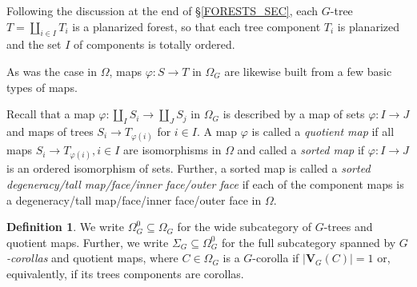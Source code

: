 \documentclass[a4paper,10pt
,draft
]{article}%
\numberwithin{equation}{section}
\numberwithin{figure}{section}
\theoremstyle{definition} %
\newtheorem{definition}[equation]{Definition}%
\newcommand{\1}{\ensuremath{\mathbbm 1}}%
\begin{document}
Following the discussion at the end of \S \ref{FORESTS_SEC},
each $G$-tree
$T = \amalg_{i \in I} T_i$
is a planarized forest,
so that each tree component $T_i$
is planarized and the set $I$ of components
is totally ordered.

As was the case in $\Omega$,
maps $\varphi \colon S \to T$ in $\Omega_G$
are likewise built from a few basic types of maps.

Recall that a map
$\varphi \colon 
\amalg_I S_i
\to
\amalg_J S_j
$
in $\Omega_G$
is described by a map of sets
$\varphi \colon I \to J$
and maps of trees
$S_i \to T_{\varphi(i)}$ for $i \in I$.
A map $\varphi$
is called a 
\emph{quotient map}
if all maps 
$S_i \to T_{\varphi(i)}, i \in I$
are isomorphisms in $\Omega$
and called a 
\emph{sorted map} if
$\varphi \colon I \to J$
is an ordered isomorphism of sets.
Further, a sorted map
is called a
\emph{sorted degeneracy/tall map/face/inner face/outer face}
if each of the component maps is a
degeneracy/tall map/face/inner face/outer face 
in $\Omega$.



\begin{definition}
	We write $\Omega_G^0 \subseteq \Omega_G$ for the wide subcategory of $G$-trees and quotient maps.
	Further, we write $\Sigma_G \subseteq \Omega_G^0$ for the full subcategory spanned by \textit{$G$-corollas} and quotient maps,
	where $C \in \Omega_G$ is a $G$-corolla if $|\boldsymbol{V}_G(C)| = 1$
	or, equivalently,
	if its trees components are corollas.
\end{definition}
\end{document}
